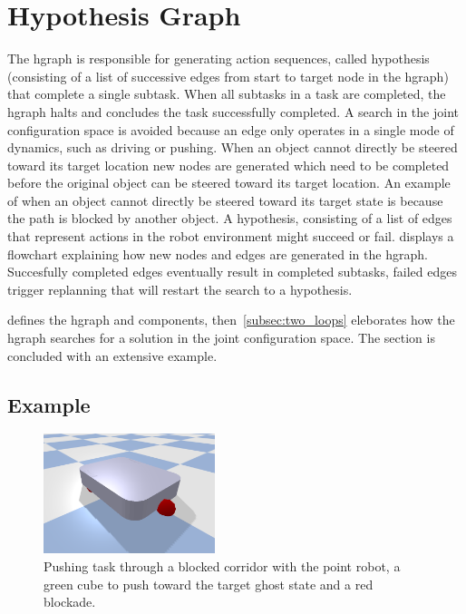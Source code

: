 \section{Hypothesis Graph}%
\label{sec:hgraph}
The \ac{hgraph} is responsible for generating action sequences, called hypothesis (consisting of a list of successive edges from start to target node in the \ac{hgraph}) that complete a single subtask. When all subtasks in a task are completed, the \ac{hgraph} halts and concludes the task successfully completed. A search in the joint configuration space is avoided because an edge only operates in a single mode of dynamics, such as driving or pushing. When an object cannot directly be steered toward its target location new nodes are generated which need to be completed before the original object can be steered toward its target location. An example of when an object cannot directly be steered toward its target state is because the path is blocked by another object. A hypothesis, consisting of a list of edges that represent actions in the robot environment might succeed or fail.  displays a flowchart explaining how new nodes and edges are generated in the \ac{hgraph}. Succesfully completed edges eventually result in completed subtasks, failed edges trigger replanning that will restart the search to a hypothesis.\bs

 defines the \ac{hgraph} and components, then~\cref{subsec:two_loops} eleborates how the \ac{hgraph} searches for a solution in the joint configuration space. The section is concluded with an extensive example.\bs




\subsection{Example}%
\label{subsec:hgraph_example}

\begin{figure}[H]
    \centering
    \includegraphics[width=5cm]{figures/boxer_robot.png}
    \caption{Pushing task through a blocked corridor with the point robot, a green cube to push toward the target ghost state and a red blockade.}%
\label{fig:blocked_path_example_environment}
\end{figure}


